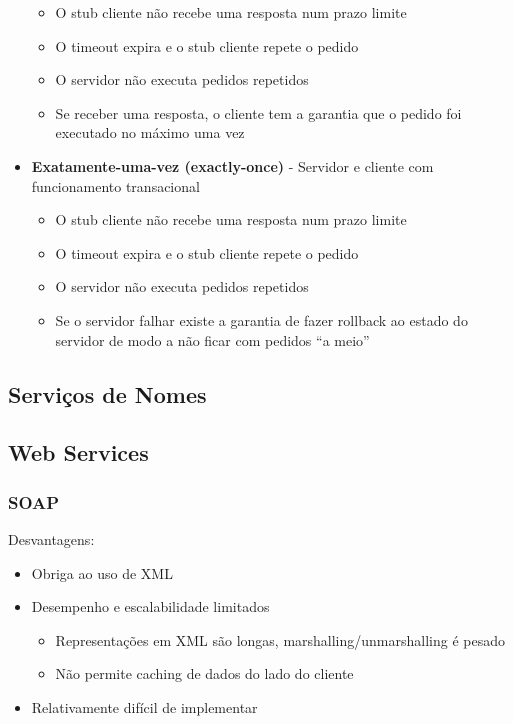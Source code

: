 \documentclass[12pt]{article}
\begin{document}
\begin{itemize}
\begin{itemize}[topsep=0pt, itemsep=0pt]
        \item O stub cliente não recebe uma resposta num prazo limite
        \item O timeout expira e o stub cliente repete o pedido
        \item O servidor não executa pedidos repetidos
        \item Se receber uma resposta, o cliente tem a garantia que o pedido foi executado no máximo uma vez
    \end{itemize}
    \item \textbf{Exatamente-uma-vez (exactly-once)} - Servidor e cliente com funcionamento transacional
    \begin{itemize}
        \item O stub cliente não recebe uma resposta num prazo limite
        \item O timeout expira e o stub cliente repete o pedido
        \item O servidor não executa pedidos repetidos
        \item Se o servidor falhar existe a garantia de fazer rollback ao
        estado do servidor de modo a não ficar com pedidos “a meio”
    \end{itemize}
\end{itemize}

\subsection{Serviços de Nomes}

\newpage

\subsection{Web Services}

\subsubsection{SOAP}

Desvantagens:
\begin{itemize}[topsep=4pt, itemsep=0pt]
    \item Obriga ao uso de XML
    \item Desempenho e escalabilidade limitados
    \begin{itemize}[topsep=0pt, itemsep=0pt]
        \item Representações em XML são longas, marshalling/unmarshalling é pesado
        \item Não permite caching de dados do lado do cliente
    \end{itemize}
    \item Relativamente difícil de implementar
\end{itemize}
\end{document}
